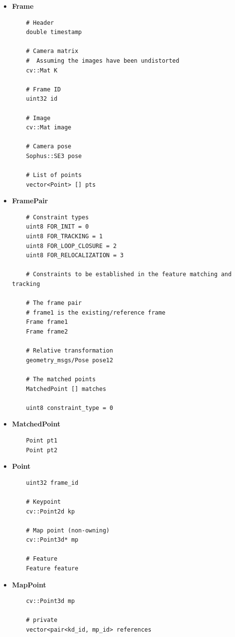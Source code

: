 \begin{itemize}
  \item \textbf{Frame}
  \begin{verbatim}
    # Header
    double timestamp

    # Camera matrix
    #  Assuming the images have been undistorted
    cv::Mat K

    # Frame ID
    uint32 id 

    # Image
    cv::Mat image
    
    # Camera pose
    Sophus::SE3 pose
    
    # List of points
    vector<Point> [] pts
  \end{verbatim}

  \item \textbf{FramePair}
  \begin{verbatim}
    # Constraint types
    uint8 FOR_INIT = 0
    uint8 FOR_TRACKING = 1
    uint8 FOR_LOOP_CLOSURE = 2
    uint8 FOR_RELOCALIZATION = 3

    # Constraints to be established in the feature matching and tracking 

    # The frame pair
    # frame1 is the existing/reference frame
    Frame frame1
    Frame frame2

    # Relative transformation
    geometry_msgs/Pose pose12

    # The matched points
    MatchedPoint [] matches

    uint8 constraint_type = 0
  \end{verbatim}

  \item \textbf{MatchedPoint}
  \begin{verbatim}
    Point pt1    
    Point pt2
  \end{verbatim}

  \item \textbf{Point}
  \begin{verbatim}
    uint32 frame_id
    
    # Keypoint
    cv::Point2d kp

    # Map point (non-owning)
    cv::Point3d* mp
    
    # Feature
    Feature feature    
  \end{verbatim}

  \item \textbf{MapPoint}
  \begin{verbatim}
    cv::Point3d mp

    # private
    vector<pair<kd_id, mp_id> references
  \end{verbatim}


\end{itemize}
